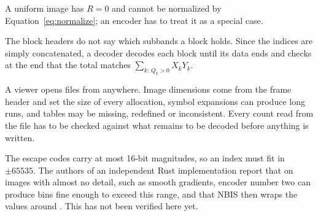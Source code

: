 \begin{description}[leftmargin=0pt]
  \item[Constant images.] A uniform image has $R = 0$ and cannot be normalized by
    Equation~\eqref{eq:normalize}; an encoder has to treat it as a special case.

  \item[Blocks beyond three.] The block headers do not say which subbands a block holds. Since the
    indices are simply concatenated, a decoder decodes each block until its data ends and checks
    at the end that the total matches $\sum_{k:\,Q_k>0} X_kY_k$.

  \item[Untrusted input.] A viewer opens files from anywhere. Image dimensions come from the frame
    header and set the size of every allocation, symbol expansions can produce long runs, and
    tables may be missing, redefined or inconsistent. Every count read from the file has to be
    checked against what remains to be decoded before anything is written.

  \item[Coefficient range.] The escape codes carry at most 16-bit magnitudes, so an index must fit
    in $\pm 65535$. The authors of an independent Rust implementation report that on images with
    almost no detail, such as smooth gradients, encoder number two can produce bins fine enough to
    exceed this range, and that NBIS then wraps the values around \cite{wsqcodec}. This has not
    been verified here yet.
\end{description}

